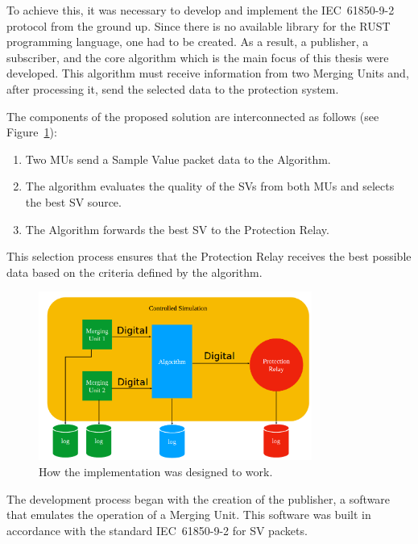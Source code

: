 To achieve this, it was necessary to develop and implement the IEC~61850-9-2 protocol from the ground up. Since there is no available library for the RUST programming language, one had to be created. As a result, a publisher, a subscriber, and the core algorithm which is the main focus of this thesis were developed. This algorithm must receive information from two Merging Units and, after processing it, send the selected data to the protection system.

The components of the proposed solution are interconnected as follows (see Figure~\ref{fig:overview_of_implementation}):
\begin{enumerate}
	\item Two MUs send a Sample Value packet data to the Algorithm.
 	\item The algorithm evaluates the quality of the SVs from both MUs and selects the best SV source.
  	\item The Algorithm forwards the best SV to the Protection Relay.
\end{enumerate}

 This selection process ensures that the Protection Relay receives the best possible data based on the criteria defined by the algorithm.

\begin{figure}[tbh!]
	\centering
	\includegraphics[width=0.80\textwidth, keepaspectratio]{ch4/assets/Implementation.png} %
	\caption{How the implementation was designed to work.}
	\label{fig:overview_of_implementation}
\end{figure}

The development process began with the creation of the publisher, a software that emulates the operation of a Merging Unit. This software was built in accordance with the standard IEC~61850-9-2 for SV packets.

